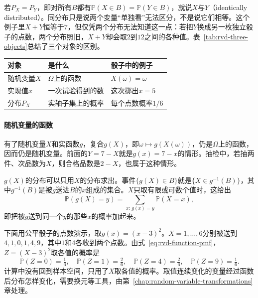 若$P_X=P_Y$，即对所有$B$都有$\mathbb{P}(X\in B)=\mathbb{P}(Y\in B)$，就说$X$与$Y$（identically distributed）。同分布只是说两个变量“单独看”无法区分，不是说它们相等。这个例子里$X+Y$恒等于$7$，但仅凭两个分布无法知道这一点：若把$Y$换成另一枚独立骰子的点数，两个分布照旧，$X+Y$却会取$2$到$12$之间的各种值。表~\ref{tab:rvd-three-objects}总结了三个对象的区别。

\begin{BookInlineTable}
  \centering
  \begin{tabular}{lll}
    \toprule
    对象 & 是什么 & 骰子中的例子\\
    \midrule
    随机变量$X$ & $\Omega$上的函数 & $X(\omega)=\omega$\\
    实现值$x$ & 一次试验得到的数 & 这次掷出$x=5$\\
    分布$P_X$ & 实轴子集上的概率 & 每个点数概率$1/6$\\
    \bottomrule
  \end{tabular}
  \caption{随机变量、实现值与分布。前者是规则，中者是一次结果，后者是取值的概率规律；$X$与$7-X$是两个不同的规则，分布却相同。}
  \label{tab:rvd-three-objects}
\end{BookInlineTable}

\paragraph{随机变量的函数}
有了随机变量$X$和实函数$g$，复合$g(X)$，即$\omega\mapsto g(X(\omega))$，仍是$\Omega$上的函数，因而仍是随机变量。前面的$Y=7-X$就是$g(x)=7-x$的情形。抽检中，若抽两件、次品数为$X$，则合格品数是$2-X$，也属于这种情形。

$g(X)$的分布可以只用$X$的分布求出。事件$\{g(X)\in B\}$就是$\{X\in g^{-1}(B)\}$，其中$g^{-1}(B)$是被$g$送进$B$的$x$组成的集合。$X$只取有限或可数个值时，这给出
\begin{equation}
  \mathbb{P}(g(X)=y)=\sum_{x:\,g(x)=y}\mathbb{P}(X=x),
  \label{eq:rvd-function-pmf}
\end{equation}
即把被$g$送到同一个$y$的那些$x$的概率加起来。

下面用公平骰子的点数演示，取$g(x)=(x-3)^{2}$。$X=1,\dots,6$分别被送到$4,1,0,1,4,9$，其中$1$和$4$各收到两个点数。由式~\eqref{eq:rvd-function-pmf}，$Z=(X-3)^{2}$取各值的概率是
\[
  \mathbb{P}(Z=0)=\tfrac16,\quad \mathbb{P}(Z=1)=\tfrac26,\quad \mathbb{P}(Z=4)=\tfrac26,\quad \mathbb{P}(Z=9)=\tfrac16 .
\]
计算中没有回到样本空间，只用了$X$取各值的概率。取值连续变化的变量经过函数后分布怎样变化，需要换元等工具，由第~\ref{chap:random-variable-transformations}章处理。

